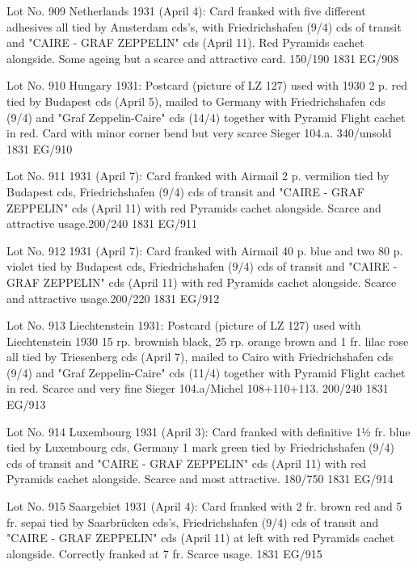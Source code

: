 \documentclass[justified]{tufte-book}
\begin{document}
%
{Lot No. 909
Netherlands 1931 (April 4): Card franked with five different adhesives all tied by Amsterdam cds's, with Friedrichshafen (9/4) cds of transit and  "CAIRE - GRAF ZEPPELIN" cds (April 11). Red Pyramids cachet alongside. Some ageing but a scarce and attractive card. 150/190}%
{1831}%
{EG/908}%
{}%
{}
{}%
{}

%
{Lot No. 910
Hungary 1931: Postcard (picture of LZ 127) used with 1930 2 p. red tied by Budapest cds (April 5), mailed to Germany with Friedrichshafen cds (9/4) and "Graf Zeppelin-Caire" cds (14/4) together with Pyramid Flight cachet in red. Card with minor corner bend but very scarce Sieger 104.a. 340/unsold}%
{1831}%
{EG/910}%
{}%
{}
{}%
{}



%
{Lot No. 911
1931 (April 7): Card franked with Airmail 2 p. vermilion tied by Budapest cds, Friedrichshafen (9/4) cds of transit and  "CAIRE - GRAF ZEPPELIN" cds (April 11) with red Pyramids cachet alongside. Scarce and attractive usage.200/240}%
{1831}%
{EG/911}%
{}%
{}
{}%
{}

%
{Lot No. 912
1931 (April 7): Card franked  with Airmail 40 p. blue and two 80 p. violet tied by Budapest cds, Friedrichshafen (9/4) cds of transit and  "CAIRE - GRAF ZEPPELIN" cds (April 11) with red Pyramids cachet alongside. Scarce and attractive usage.200/220}%
{1831}%
{EG/912}%
{}%
{}
{}%
{}




%
{Lot No. 913
Liechtenstein 1931: Postcard (picture of LZ 127) used with Liechtenstein 1930 15 rp. brownish black, 25 rp. orange brown and 1 fr. lilac rose all tied by Triesenberg cds (April 7), mailed to Cairo with Friedrichshafen cds (9/4) and "Graf Zeppelin-Caire" cds (11/4) together with Pyramid Flight cachet in red. Scarce and very fine Sieger 104.a/Michel 108+110+113. 200/240}%
{1831}%
{EG/913}%
{}%
{}
{}%
{}


%
{Lot No. 914
Luxembourg 1931 (April 3): Card franked with definitive 1½ fr. blue tied by Luxembourg cds, Germany 1 mark green tied by Friedrichshafen (9/4) cds of transit and  "CAIRE - GRAF ZEPPELIN" cds (April 11) with red Pyramids cachet alongside. Scarce and most attractive. 180/750}%
{1831}%
{EG/914}%
{}%
{}
{}%
{}


%
{Lot No. 915
Saargebiet 1931 (April 4): Card franked  with 2 fr. brown red and 5 fr. sepai tied by Saarbrücken cds's, Friedrichshafen (9/4) cds of transit and  "CAIRE - GRAF ZEPPELIN" cds (April 11) at left with red Pyramids cachet alongside. Correctly franked at 7 fr. Scarce usage.}%
{1831}%
{EG/915}%
{}%
{}
{}%
{}
\end{document}
